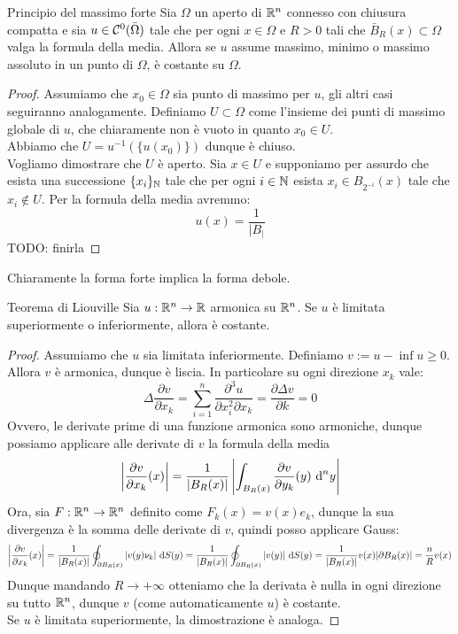 \documentclass{article}
\begin{document}
\begin{theorem}{Principio del massimo forte}{}
    Sia $\Omega$ un aperto di $\mathbb{R}^n$ connesso con chiusura compatta e sia $u \in \mathcal{C}^0(\bar{\Omega})$ tale che per ogni $x\in\Omega$ e $R>0$ tali che $\bar{B}_R(x)\subset \Omega$ valga la formula della media. Allora se $u$ assume massimo, minimo o massimo assoluto in un punto di $\Omega$, è costante su $\Omega$.
\end{theorem}
\begin{proof}
    Assumiamo che $x_0 \in \Omega$ sia punto di massimo per $u$, gli altri casi seguiranno analogamente. Definiamo $U\subset \Omega$ come l'insieme dei punti di massimo globale di $u$, che chiaramente non è vuoto in quanto $x_0\in U$.\\
    Abbiamo che $U = u^{-1}(\{u(x_0)\})$ dunque è chiuso.\\
    Vogliamo dimostrare che $U$ è aperto. Sia $x\in U$ e supponiamo per assurdo che esista una successione $\{x_i\}_{\mathbb{N}}$ tale che per ogni $i \in \mathbb{N}$ esista $x_i \in B_{2^{-i}}(x)$ tale che $x_i\notin U$. Per la formula della media avremmo:
    \[u(x) = \frac{1}{|B_|}\]
    TODO: finirla
\end{proof}

\begin{remark}{}{}
    Chiaramente la forma forte implica la forma debole.
\end{remark}

\begin{theorem}{Teorema di Liouville}{}
    Sia $u:\mathbb{R}^n\to\mathbb{R}$ armonica su $\mathbb{R}^n$. Se $u$ è limitata superiormente o inferiormente, allora è costante.
\end{theorem}
\begin{proof}
    Assumiamo che $u$ sia limitata inferiormente. Definiamo $v := u-\inf u \ge 0$. Allora $v$ è armonica, dunque è liscia. In particolare su ogni direzione $x_k$ vale:
    \[\Delta \frac{\partial v}{\partial x_k} =\sum_{i = 1}^n \frac{\partial^3 u}{\partial x_i^2 \partial x_k} = \frac{\partial \Delta v}{\partial k} = 0\]
    Ovvero, le derivate prime di una funzione armonica sono armoniche, dunque possiamo applicare alle derivate di $v$ la formula della media
    \[\left|\frac{\partial v}{\partial x_k}(x)\right| =\frac{1}{|B_R(x)|}\left| \int_{B_R(x)}\frac{\partial v}{\partial y_k}(y) \text{ d}^n y\right|\]
    Ora, sia $F : \mathbb{R}^n\to\mathbb{R}^n$ definito come $F_k(x) = v(x)e_k$, dunque la sua divergenza è la somma delle derivate di $v$, quindi posso applicare Gauss:
    \[\left|\frac{\partial v}{\partial x_k}(x)\right| = \frac{1}{|B_R(x)|} \oint_{\partial B_R(x)}|v(y) \nu_k |\text{ d} S(y) = \frac{1}{|B_R(x)|} \oint_{\partial B_R(x)}|v(y)|\text{ d} S(y) = \frac{1}{|B_R(x)|} v(x) |\partial B_R(x)| = \frac{n}{R}v(x)\]
    Dunque mandando $R\to +\infty$ otteniamo che la derivata è nulla in ogni direzione su tutto $\mathbb{R}^n$, dunque $v$ (come automaticamente $u$) è costante.\\
    Se $u$ è limitata superiormente, la dimostrazione è analoga.
\end{proof}
\end{document}
